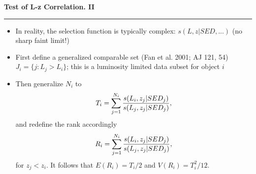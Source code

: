\documentclass[letterpaper,landscape]{slides}
\begin{document}
\begin{slide}
\begin{center}
\bfseries
{\large {\color{red} Test of L-z Correlation. II}}
\end{center}
\vskip 0.2in
\hrule

\begin{itemize}
\item In reality, the selection function is typically complex:
      $s(L,z|SED, ...)$ (no sharp faint limit!)
\item First define a generalized comparable set (Fan et al. 2001;
      AJ 121, 54)
      $J_i = \{ j:L_j > L_i\}$; this is a luminosity limited data 
      subset for object $i$
\item Then generalize $N_i$ to
\begin{equation}
        T_i = \sum_{j=1}^{N_i} {s(L_i, z_j|SED_j) \over s(L_j, z_j|SED_j)},
\end{equation}
and redefine the rank accordingly
\begin{equation}
        R_i = \sum_{j=1}^{N_i} {s(L_i, z_j|SED_j) \over s(L_j, z_j|SED_j)},
\end{equation}
for $z_j < z_i$. It follows that $E(R_i) = T_i/2$ and $V(R_i) = T_i^2/12$. 

\end{itemize}

\vfill
\end{slide}
 
\end{document}
